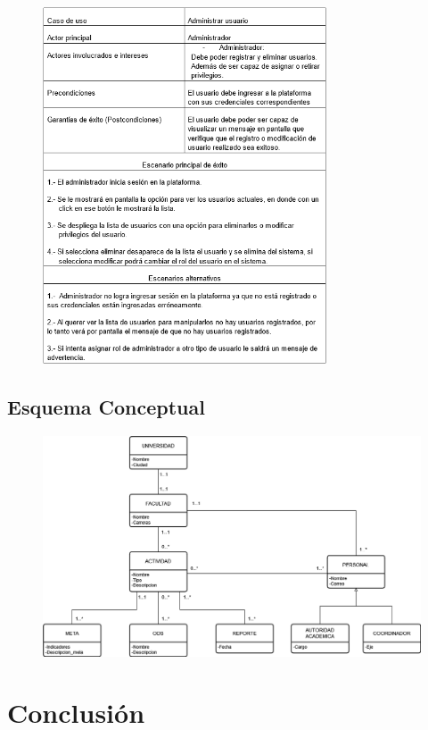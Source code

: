 \documentclass[12pt]{article}
\begin{document}
\begin{figure}[h]
  \centering
  \includegraphics[width=0.75\textwidth]{caso3.png}
\end{figure}

\clearpage
\subsection{Esquema Conceptual}
\vspace{50pt}
\begin{figure}[h]
  \centering
  \includegraphics[width=1\textwidth]{esquema.png}
\end{figure}
\clearpage
\section{Conclusión}
\end{document}
